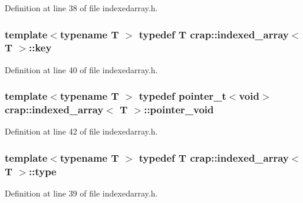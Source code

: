 Definition at line 38 of file indexedarray.\+h.

\hypertarget{classcrap_1_1indexed__array_afdc964d76a19bb2f302fe43fefa5b5f3}{
\subsubsection[{key}]{\setlength{\rightskip}{0pt plus 5cm}template$<$typename T $>$ typedef T {\bf crap\+::indexed\+\_\+array}$<$ T $>$\+::{\bf key}}}\label{classcrap_1_1indexed__array_afdc964d76a19bb2f302fe43fefa5b5f3}


Definition at line 40 of file indexedarray.\+h.

\hypertarget{classcrap_1_1indexed__array_a8590198c1f75bc14843f09c491a446e9}{
\subsubsection[{pointer\+\_\+void}]{\setlength{\rightskip}{0pt plus 5cm}template$<$typename T $>$ typedef {\bf pointer\+\_\+t}$<$void$>$ {\bf crap\+::indexed\+\_\+array}$<$ T $>$\+::{\bf pointer\+\_\+void}}}\label{classcrap_1_1indexed__array_a8590198c1f75bc14843f09c491a446e9}


Definition at line 42 of file indexedarray.\+h.

\hypertarget{classcrap_1_1indexed__array_a30710c6c57a6a6fbe151809b415c856e}{
\subsubsection[{type}]{\setlength{\rightskip}{0pt plus 5cm}template$<$typename T $>$ typedef T {\bf crap\+::indexed\+\_\+array}$<$ T $>$\+::{\bf type}}}\label{classcrap_1_1indexed__array_a30710c6c57a6a6fbe151809b415c856e}


Definition at line 39 of file indexedarray.\+h.



